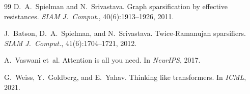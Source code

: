 \documentclass[11pt,a4paper]{article}
\theoremstyle{plain}
\theoremstyle{definition}
\theoremstyle{remark}
\begin{document}
\begin{thebibliography}{99}
D.~A.~Spielman and N.~Srivastava. Graph sparsification by effective resistances. \emph{SIAM J.~Comput.}, 40(6):1913--1926, 2011.

J.~Batson, D.~A.~Spielman, and N.~Srivastava. Twice-{R}amanujan sparsifiers. \emph{SIAM J.~Comput.}, 41(6):1704--1721, 2012.

A.~Vaswani et~al. Attention is all you need. In \emph{NeurIPS}, 2017.

G.~Weiss, Y.~Goldberg, and E.~Yahav. Thinking like transformers. In \emph{ICML}, 2021.

\end{thebibliography}
\end{document}

